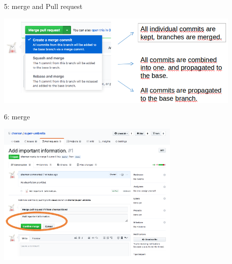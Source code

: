 \begin{frame}{ }
\begin{exampleblock}{5: merge and Pull request}
    \begin{center}
    \includegraphics[height=4.5cm]{05_history/Images/FAIR_githubTP_mergeConfig.png}
    \end{center}
\end{exampleblock}
\end{frame}
\begin{frame}{ }
\begin{exampleblock}{6: merge}
    \begin{center}
    \includegraphics[height=7cm]{05_history/Images/FAIR_githubTP_confirmMerge.png}
    \end{center}
\end{exampleblock}
\end{frame}
